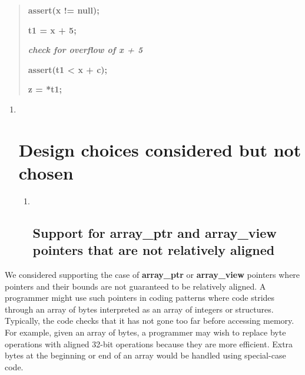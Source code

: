 \documentclass[]{article}
\begin{document}
\begin{quote}
\textbf{assert(x != null);}

\textbf{t1 = x + 5;}

\emph{\textbf{check for overflow of x + 5}}

\textbf{assert(t1 \textless{} x + c);}

\textbf{z = *t1;}
\end{quote}

\begin{enumerate}
\def\labelenumi{\arabic{enumi}.}
\item ~
  \section{\texorpdfstring{\protect\hypertarget{ux5fToc422907007}{}{\protect\hypertarget{ux5fToc424307736}{}{\protect\hypertarget{ux5fToc426641139}{}{\protect\hypertarget{ux5fToc435435014}{}{\protect\hypertarget{ux5fToc437460848}{}{\protect\hypertarget{ux5fToc440445529}{}{\protect\hypertarget{ux5fToc440449311}{}{\protect\hypertarget{ux5fToc440551961}{}{}}}}}}}}Design
  choices considered but not
  chosen}{Design choices considered but not chosen}}\label{design-choices-considered-but-not-chosen}

  \begin{enumerate}
  \def\labelenumii{\arabic{enumii}.}
  \item ~
    \subsection{\texorpdfstring{\protect\hypertarget{ux5fRef421712477}{}{\protect\hypertarget{ux5fToc422907008}{}{\protect\hypertarget{ux5fToc424307737}{}{\protect\hypertarget{ux5fToc426641140}{}{\protect\hypertarget{ux5fToc435435015}{}{\protect\hypertarget{ux5fToc437460849}{}{\protect\hypertarget{ux5fToc440445530}{}{\protect\hypertarget{ux5fToc440449312}{}{\protect\hypertarget{ux5fToc440551962}{}{}}}}}}}}}Support
    for array\_ptr and array\_view pointers that are not relatively
    aligned}{Support for array\_ptr and array\_view pointers that are not relatively aligned}}\label{support-for-arrayux5fptr-and-arrayux5fview-pointers-that-are-not-relatively-aligned}
  \end{enumerate}
\end{enumerate}

We considered supporting the case of \textbf{array\_ptr} or
\textbf{array\_view} pointers where pointers and their bounds are not
guaranteed to be relatively aligned. A programmer might use such
pointers in coding patterns where code strides through an array of bytes
interpreted as an array of integers or structures. Typically, the code
checks that it has not gone too far before accessing memory. For
example, given an array of bytes, a programmer may wish to replace byte
operations with aligned 32-bit operations because they are more
efficient. Extra bytes at the beginning or end of an array would be
handled using special-case code.
\end{document}
